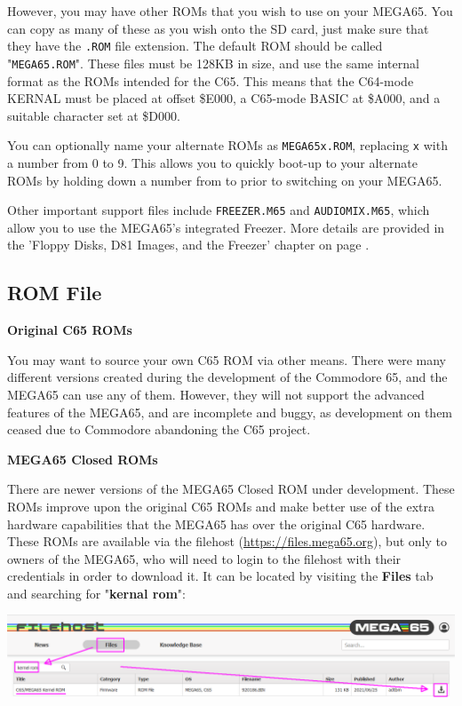 However, you may have other ROMs that you wish to
use on your MEGA65.
You can copy as many of these as you wish onto the
SD card, just make sure that they have the {\tt .ROM} file extension.  The default ROM
should be called "{\tt MEGA65.ROM}". These files
must be 128KB in size, and use the same internal format as the ROMs
intended for the C65.  This means that the C64-mode KERNAL must be
placed at offset \$E000, a C65-mode BASIC at \$A000, and a suitable
character set at \$D000.

You can optionally name your alternate ROMs as {\tt MEGA65x.ROM}, replacing {\tt x} with a number from 0 to 9.
This allows you to quickly boot-up to your alternate ROMs by holding down a number from  to  prior
to switching on your MEGA65.

Other important support files include {\tt FREEZER.M65} and {\tt AUDIOMIX.M65}, which
allow you to use the MEGA65's integrated Freezer. More details are provided in the
'Floppy Disks, D81 Images, and the Freezer' chapter on page \pageref{cha:freezer}.

\subsection{ROM File}

\textbf{Original C65 ROMs}

You may want to source your own C65 ROM via other means.
There were many different versions created during the development of the Commodore 65,
and the MEGA65 can use any of them.  However, they will not support the advanced
features of the MEGA65, and are incomplete and buggy, as development on them ceased
due to Commodore abandoning the C65 project.

\textbf{MEGA65 Closed ROMs}

There are newer versions of the MEGA65 Closed ROM under development. These ROMs improve upon the original C65 ROMs and make better use of the extra hardware capabilities that the MEGA65 has over the original C65 hardware. These ROMs are available via the filehost (\url{https://files.mega65.org}), but only to owners of the MEGA65, who will need to login to the filehost with their credentials in order to download it. It can be located by visiting the \textbf{Files} tab and searching for "\textbf{kernal rom}":

\includegraphics[width=\linewidth]{images/latest_closed_rom.png}

